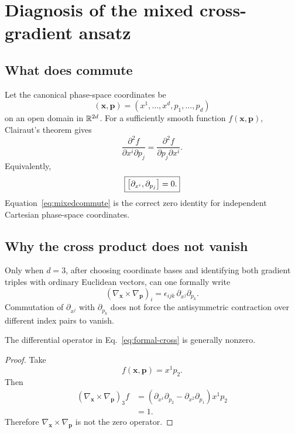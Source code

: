 \section{Diagnosis of the mixed cross-gradient ansatz}

\subsection{What does commute}

Let the canonical phase-space coordinates be
\[
(\bm{x},\bm{p})=(x^1,\ldots,x^d,p_1,\ldots,p_d)
\]
on an open domain in \(\mathbb{R}^{2d}\). For a sufficiently smooth function \(f(\bm{x},\bm{p})\), Clairaut's theorem gives
\begin{equation}
\frac{\partial^2 f}{\partial x^i\partial p_j}
=
\frac{\partial^2 f}{\partial p_j\partial x^i}.
\end{equation}
Equivalently,
\begin{equation}
\boxed{
\left[\partial_{x^i},\partial_{p_j}\right]=0.
}
\label{eq:mixedcommute}
\end{equation}
Equation~\eqref{eq:mixedcommute} is the correct zero identity for independent Cartesian phase-space coordinates.

\subsection{Why the cross product does not vanish}

Only when \(d=3\), after choosing coordinate bases and identifying both gradient triples with ordinary Euclidean vectors, can one formally write
\begin{equation}
\left(\nabla_{\bm{x}}\times\nabla_{\bm{p}}\right)_i
=
\epsilon_{ijk}\,
\partial_{x^j}\partial_{p_k}.
\label{eq:formal-cross}
\end{equation}
Commutation of \(\partial_{x^j}\) with \(\partial_{p_k}\) does not force the antisymmetric contraction over different index pairs to vanish.

\begin{proposition}
The differential operator in Eq.~\eqref{eq:formal-cross} is generally nonzero.
\end{proposition}

\begin{proof}
Take
\[
f(\bm{x},\bm{p})=x^1p_2.
\]
Then
\begin{align}
\left(\nabla_{\bm{x}}\times\nabla_{\bm{p}}\right)_3f
&=
\left(
\partial_{x^1}\partial_{p_2}
-
\partial_{x^2}\partial_{p_1}
\right)x^1p_2
\\
&=1.
\end{align}
Therefore \(\nabla_{\bm{x}}\times\nabla_{\bm{p}}\) is not the zero operator.
\end{proof}

